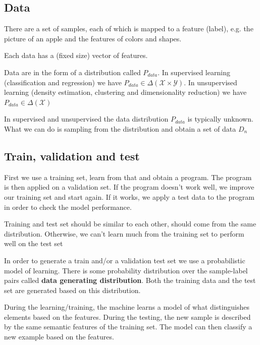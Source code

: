 \documentclass{article}
\begin{document}
\subsection*{Data}
There are a set of samples, each of which is mapped to a feature (label), e.g. the picture of an apple and the features of colors and shapes.

Each data has a (fixed size) vector of features.

	
\bigskip
Data are in the form of a distribution called \(P_{data}\). In supervised learning (classification and regression) we have \(P_{data} \in \Delta(\mathcal{X} \times \mathcal{Y})\). In unsupervised learning (density estimation, clustering and dimensionality reduction) we have \(P_{data} \in \Delta(\mathcal{X})\)
	
	
	
\bigskip

In supervised and unsupervised the data distribution \(P_{data}\) is typically unknown. What we can do is sampling from the distribution and obtain a set of data \(D_n\)


\subsection*{Train, validation and test}

First we use a training set, learn from that and obtain a program. The program is then applied on a validation set. If the program doesn't work well, we improve our training set and start again. If it works, we apply a test data to the program in order to check the model performance.

Training and test set should be similar to each other, should come from the same distribution. Otherwise, we can't learn much from the training set to perform well on the test set
	
\bigskip

In order to generate a train and/or a validation test set we use a probabilistic model of learning. There is some probability distribution over the sample-label pairs called \textbf{data generating distribution}. Both the training data and the test set are generated based on this distribution.

\bigskip 

During the learning/training, the machine learns a model of what distinguishes elements based on the features. During the testing, the new sample is described by the same semantic features of the training set. The model can then classify a new example based on the features.
\end{document}
